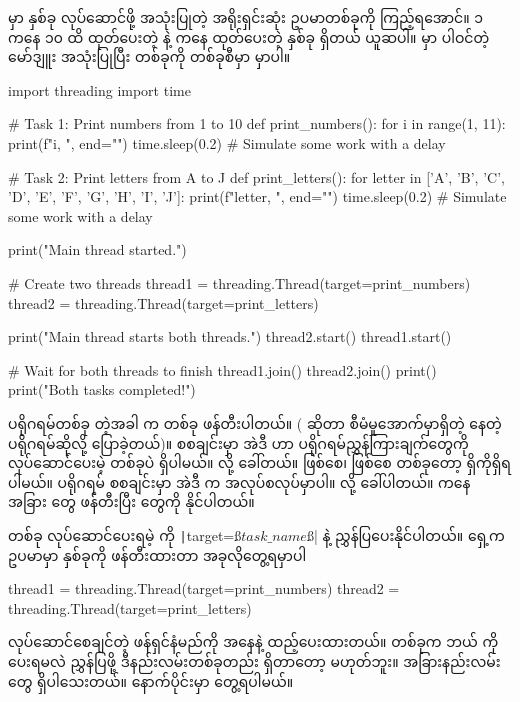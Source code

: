 မှာ  နှစ်ခု  လုပ်ဆောင်ဖို့  အသုံးပြုတဲ့ အရိုးရှင်းဆုံး ဥပမာတစ်ခုကို ကြည့်ရအောင်။ ၁ ကနေ ၁၀ ထိ ထုတ်ပေးတဲ့  နဲ့  ကနေ  ထုတ်ပေးတဲ့  နှစ်ခု ရှိတယ် ယူဆပါ။  မှာ ပါဝင်တဲ့  မော်ဒျူး အသုံးပြုပြီး   တစ်ခုကို  တစ်ခုစီမှာ  မှာပါ။

%
\begin{py}
import threading
import time

# Task 1: Print numbers from 1 to 10
def print_numbers():
    for i in range(1, 11):
        print(f"{i}, ", end="")
        time.sleep(0.2)  # Simulate some work with a delay

# Task 2: Print letters from A to J
def print_letters():
    for letter in ['A', 'B', 'C', 'D', 'E', 'F', 'G', 'H', 'I', 'J']:
        print(f"{letter}, ", end="")
        time.sleep(0.2)  # Simulate some work with a delay

print("Main thread started.")

# Create two threads
thread1 = threading.Thread(target=print_numbers)
thread2 = threading.Thread(target=print_letters)

print("Main thread starts both threads.")
thread2.start()
thread1.start()

# Wait for both threads to finish
thread1.join()
thread2.join()
print()
print("Both tasks completed!")
\end{py}
%

ပရိုဂရမ်တစ်ခု  တဲ့အခါ  က  တစ်ခု ဖန်တီးပါတယ်။ ( ဆိုတာ  စီမံမှုအောက်မှာရှိတဲ့  နေတဲ့ ပရိုဂရမ်ဆိုလို့ ပြောခဲ့တယ်)။ စစချင်းမှာ အဲဒီ  ဟာ ပရိုဂရမ်ညွှန်ကြားချက်တွေကို လုပ်ဆောင်ပေးမဲ့  တစ်ခုပဲ ရှိပါမယ်။   လို့ ခေါ်တယ်။  ဖြစ်စေ၊  ဖြစ်စေ  တစ်ခုတော့ ရှိကိုရှိရပါမယ်။ ပရိုဂရမ် စစချင်းမှာ အဲဒီ  က အလုပ်စလုပ်မှာပါ။  လို့ ခေါ်ပါတယ်။  ကနေ အခြား  တွေ ဖန်တီးပြီး  တွေကို   နိုင်ပါတယ်။ 

 တစ်ခု လုပ်ဆောင်ပေးရမဲ့  ကို \texttt|target=ß$task\_name$ß| နဲ့ ညွှန်ပြပေးနိုင်ပါတယ်။ ရှေ့ကဥပမာမှာ   နှစ်ခုကို ဖန်တီးထားတာ အခုလိုတွေ့ရမှာပါ
%
\begin{py}
thread1 = threading.Thread(target=print_numbers)
thread2 = threading.Thread(target=print_letters)
\end{py}
%
လုပ်ဆောင်စေချင်တဲ့ ဖန်ရှင်နံမည်ကို  အနေနဲ့ ထည့်ပေးထားတယ်။  တစ်ခုက ဘယ်  ကို  ပေးရမလဲ ညွှန်ပြဖို့ ဒီနည်းလမ်းတစ်ခုတည်း ရှိတာတော့ မဟုတ်ဘူး။ အခြားနည်းလမ်းတွေ ရှိပါသေးတယ်။ နောက်ပိုင်းမှာ တွေ့ရပါမယ်။


